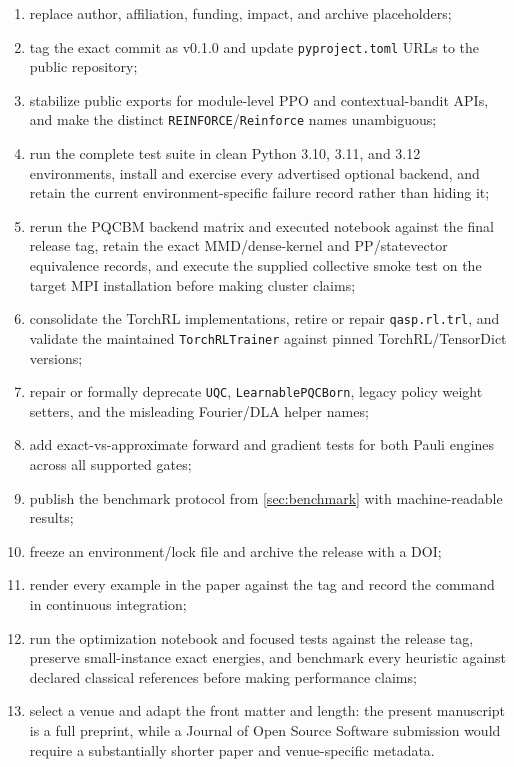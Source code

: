 \documentclass[10pt]{article}
\newcommand{\code}[1]{\texttt{#1}}
\newcommand{\version}{0.1.0}
\begin{document}
\begin{enumerate}
  \item replace author, affiliation, funding, impact, and archive placeholders;
  \item tag the exact commit as v\version{} and update \code{pyproject.toml} URLs to the public repository;
  \item stabilize public exports for module-level PPO and contextual-bandit APIs, and make the distinct \code{REINFORCE}/\code{Reinforce} names unambiguous;
  \item run the complete test suite in clean Python 3.10, 3.11, and 3.12 environments, install and exercise every advertised optional backend, and retain the current environment-specific failure record rather than hiding it;
  \item rerun the PQCBM backend matrix and executed notebook against the final
        release tag, retain the exact MMD/dense-kernel and PP/statevector
        equivalence records, and execute the supplied collective smoke test on
        the target MPI installation before making cluster claims;
  \item consolidate the TorchRL implementations, retire or repair \code{qasp.rl.trl}, and validate the maintained \code{TorchRLTrainer} against pinned TorchRL/TensorDict versions;
  \item repair or formally deprecate \code{UQC}, \code{LearnablePQCBorn}, legacy policy weight setters, and the misleading Fourier/DLA helper names;
  \item add exact-vs-approximate forward and gradient tests for both Pauli engines across all supported gates;
  \item publish the benchmark protocol from \cref{sec:benchmark} with machine-readable results;
  \item freeze an environment/lock file and archive the release with a DOI;
  \item render every example in the paper against the tag and record the command in continuous integration;
  \item run the optimization notebook and focused tests against the release tag,
        preserve small-instance exact energies, and benchmark every heuristic
        against declared classical references before making performance claims;
  \item select a venue and adapt the front matter and length: the present manuscript is a full preprint, while a Journal of Open Source Software submission would require a substantially shorter paper and venue-specific metadata.
\end{enumerate}
\end{document}
